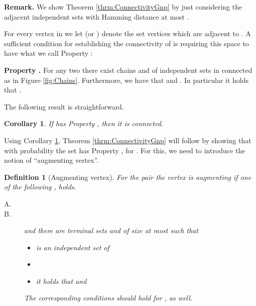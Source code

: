 \documentclass[a4paper,10pt]{article}
\newtheorem{corollary}{Corollary}\renewcommand{\thecorollary}{\arabic{corollary}}
\newtheorem{definition}{Definition}\renewcommand{\thedefinition}{\arabic{definition}}
\begin{document}
\noindent
{\bf Remark.} 
We show Theorem \ref{thrm:ConnectivityGnp} by just considering 
the adjacent independent sets with Hamming distance at most .
\\ \vspace{-.3cm}



\noindent
For every vertex  in  we let   (or )
denote the  set vertices which are  adjacent to .
A sufficient condition for establishing the connectivity of
 is requiring this space to have what
we call  Property :\\ \vspace{-.3cm}

\noindent
{\bf Property .}
For any two   there 
exist chains  and  of 
independent sets in  connected as in Figure \ref{fig:Chains}.
Furthermore, we have that 
and . In particular it holds
that .\\ \vspace{-.3cm}

\noindent
The following result is straightforward.

\begin{corollary}\label{cor:GPropertyToConnect}
If  has Property , then it is connected.
\end{corollary}



\noindent
Using Corollary \ref{cor:GPropertyToConnect}, Theorem \ref{thrm:ConnectivityGnp} 
will follow by showing that with probability  the set  
has Property , for  .
For this, we need to introduce the notion of ``augmenting vertex''.



\begin{definition}[Augmenting vertex]
For the pair  the vertex
 is {\em augmenting} if
one of the following ,  holds.
\begin{description}
	\item[A.] 
	\item[B.]  and there are
	 {\em terminal sets}  and  of size at most  such that
	\begin{itemize}
		\item  is an independent set of 
		\item   
		\item  it holds that  and 
	\end{itemize}
	The corresponding conditions should hold for , as well.
\end{description}
\end{definition} 
\end{document}
